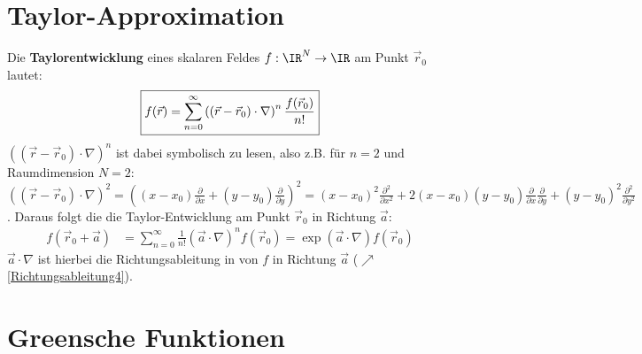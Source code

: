   \section{Taylor-Approximation}
  Die \textbf{Taylorentwicklung} eines skalaren Feldes $f:\IR^N\to\IR$ am Punkt $\vec{r}_0 $ lautet:
  \begin{equation}\begin{split}
  	 \Aboxed{	f(\vec{r})&=\sum_{n=0}^\infty \left((\vec{r}-\vec{r}_0)\cdot\nabla\right)^n\frac{f(\vec{r}_0)}{n!}}\\
  	   \end{split}\end{equation}
 $\left((\vec{r}-\vec{r}_0)\cdot\nabla\right)^n$ ist dabei symbolisch zu lesen, also z.B. für $n=2$ und Raumdimension $N=2$: $\left((\vec{r}-\vec{r}_0)\cdot\nabla\right)^2 = \left((x-x_0)\frac{\partial }{\partial x}+(y-y_0)\frac{\partial }{\partial y}\right)^2=(x-x_0)^2\frac{\partial^2 }{\partial x^2}+2(x-x_0)(y-y_0)\frac{\partial }{\partial x}\frac{\partial }{\partial y}+(y-y_0)^2\frac{\partial^2 }{\partial y^2}$. Daraus folgt die die Taylor-Entwicklung am Punkt $\vec{r}_0$ in Richtung $\vec{a}$:
       \begin{equation}\label{TaylorSkalar}\begin{split}
  		  f(\vec{r}_0 +\vec{a}) &= \sum_{n=0}^\infty \frac{1}{n!} (\vec{a} \cdot \nabla)^n f(\vec{r}_0 ) = \exp(\vec{a} \cdot \nabla) f(\vec{r}_0 ) 
  \end{split}\end{equation}
 $\vec{a} \cdot \nabla$ ist hierbei die Richtungsableitung in von $f$ in Richtung $\vec{a}$ ($\nearrow$ \ref{Richtungsableitung4}).
\section{Greensche Funktionen}\label{greenfkt}

